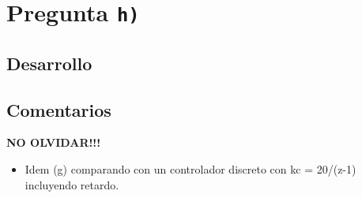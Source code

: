 \section{Pregunta \texttt{h)}}\label{pregunta-h}


\subsection{Desarrollo}


\FloatBarrier
\subsection{Comentarios}

\textbf{NO OLVIDAR!!!}


\begin{itemize}
  \item Idem (g) comparando con un controlador discreto con kc = 20/(z-1) incluyendo retardo.
\end{itemize}
